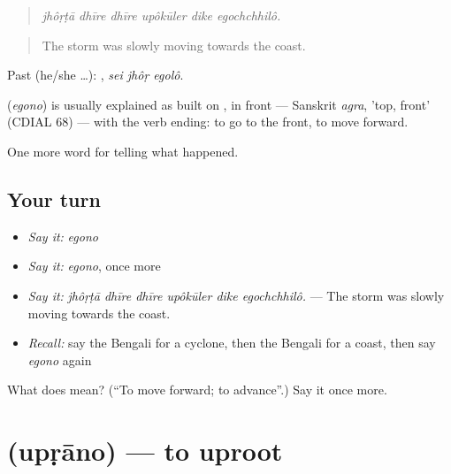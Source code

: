 \begin{quote}
     
\end{quote}

\begin{quote}
\emph{jhôṛṭā dhīre dhīre upôkūler dike egochchhilô.}
\end{quote}

\begin{quote}
The storm was slowly moving towards the coast.
\end{quote}

Past (he/she …):   , \emph{sei jhôṛ egolô}.

\begin{cousinweb}
\textbf{} (\emph{egono}) is usually explained as built on \textbf{}, in front — Sanskrit \emph{agra}, 'top, front' (CDIAL 68) — with the verb ending: to go to the front, to move forward.
\end{cousinweb}

\begin{grammarlens}[title={What you've built}]
One more word for telling what happened.
\end{grammarlens}

\subsection*{Your turn}
\begin{itemize}
\raggedright
  \item \emph{Say it:} \emph{egono}
  \item \emph{Say it:} \emph{egono}, once more
  \item \emph{Say it:} \emph{jhôṛṭā dhīre dhīre upôkūler dike egochchhilô.} — The storm was slowly moving towards the coast.
  \item \emph{Recall:} say the Bengali for a cyclone, then the Bengali for a coast, then say \emph{egono} again
\end{itemize}

\begin{tcolorbox}[breakable,colback=teal!4,colframe=teal!35!black,title={Before you move on}]
What does  mean? (\textquotedblleft{}To move forward; to advance\textquotedblright{}.) Say it once more.
\end{tcolorbox}
\section[\texorpdfstring{\bn{উপড়ানো} (upṛāno)}{উপড়ানো (upṛāno)}]{ (upṛāno) — to uproot}


